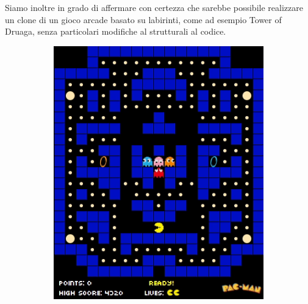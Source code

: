 \documentclass[12pt,a4paper]{report}
\begin{document}
Siamo inoltre in grado di affermare con certezza che sarebbe possibile realizzare un clone di un gioco arcade basato su labirinti, come ad esempio Tower of Druaga, senza particolari modifiche al strutturali al codice.

\begin{figure}[hb!]
\begin{subfigure}{.32\textwidth}
  \centering
  \includegraphics[width=.95\linewidth]{maze2}
  \caption{}
  \label{fig:snap1}
\end{subfigure}%
\begin{subfigure}{.32\textwidth}
  \centering

\end{subfigure}
\end{figure}
\end{document}
